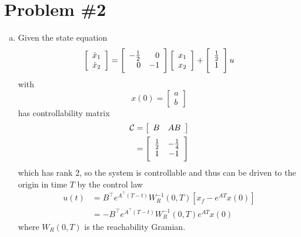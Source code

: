 \documentclass{article}
\begin{document}
\section*{Problem \#2}
\begin{enumerate}[(a)]
  \item{
  Given the state equation
  $$
  \left[\begin{array}{c}
    \dot{x}_1 \\ \dot{x}_2
  \end{array}\right]
= \left[\begin{array}{r r}
    -\frac{1}{2} & 0 \\ 0 & -1
  \end{array}\right]
  \left[\begin{array}{c}
    x_1 \\ x_2
  \end{array}\right]
+ \left[\begin{array}{c}
    \frac{1}{2} \\ 1
  \end{array}\right]
  u
  $$
  with
  $$
  x(0) = \left[\begin{array}{c}
    a \\ b
  \end{array}\right]
  $$
  has controllability matrix
  \begin{align*}
    \mathcal{C} &=
    \left[\begin{array}{c c}
      B & AB
    \end{array}\right] \\
  &=
    \left[\begin{array}{c c}
      \frac{1}{2} & -\frac{1}{4} \\
      1           & -1
    \end{array}\right] \\
  \end{align*}
  which has rank 2, so the system is controllable
  and thus can be driven to the origin in time $T$
  by the control law
  \begin{align*}
    u(t) &=  B^\top e^{A^\top(T - t)} W_R^{-1}(0, T)
             [x_f - e^{AT} x(0)] \\
         &= -B^\top e^{A^\top(T - t)} W_R^{-1}(0, T) e^{AT} x(0)
  \end{align*}
  where $W_R(0, T)$ is the reachability Gramian.

}
\end{enumerate}
\end{document}
